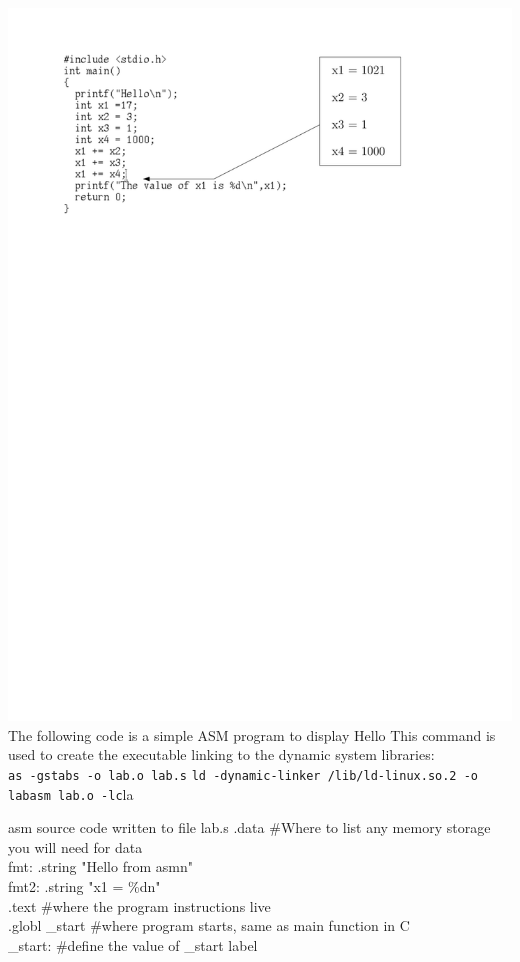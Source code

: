 \documentclass{article}
\begin{document}
\includegraphics{model4.pdf}  \\
\clearpage
The following code is a simple ASM program to display Hello
This command is used to create the executable linking to the dynamic system libraries: \\
\verb|as -gstabs -o lab.o lab.s|
\verb|ld -dynamic-linker /lib/ld-linux.so.2 -o labasm lab.o -lc|la
\begin{GFT}{asm source code written to file lab.s}
\+.data \#Where to list any memory storage you will need for data\\
\+fmt: .string "Hello from asm\Backslash{}n"\\
\+fmt2: .string "x1 = \%d\Backslash{}n"\\
\+.text \#where the program instructions live\\
\+.globl \_start \#where program starts, same as main function in C\\
\+\_start: \#define the value of \_start label\\
\end{GFT}
\end{document}

